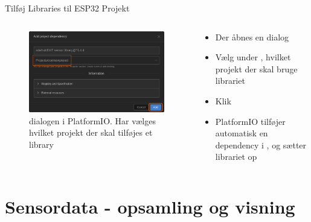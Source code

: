 \documentclass[aspectratio=169]{beamer}
\begin{document}
\begin{frame}{Tilføj Libraries til ESP32 Projekt}
\begin{columns}
	\begin{column}{0.5\textwidth}
		\begin{figure}
  			\includegraphics[width=\textwidth,keepaspectratio=true]{assets/pictures/pio-libraries-3.png}
  			\caption{ dialogen i PlatformIO. Har vælges hvilket projekt der skal tilføjes et library}
  			\label{fig:pio-libraries-3}
		\end{figure}
	\end{column}
	\begin{column}{0.5\textwidth}
		\begin{textBox}
			\begin{itemize}
				\item Der åbnes en  dialog
				\item Vælg under , hvilket projekt der skal bruge librariet
				\item Klik 
				\item PlatformIO tilføjer automatisk en  dependency i , og sætter librariet op
			\end{itemize}
		\end{textBox}
	\end{column}
\end{columns}
\end{frame}

\section{Sensordata - opsamling og visning}
\begin{frame}
\end{frame}
\end{document}
